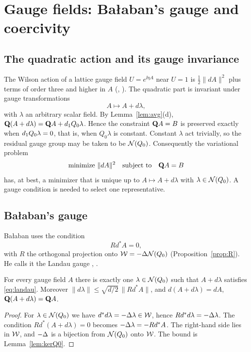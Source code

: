 \section{Gauge fields: \texorpdfstring{Ba\l aban}{Balaban}'s gauge and coercivity}\label{sec:gauge-coercivity}

\subsection{The quadratic action and its gauge invariance}

The Wilson action of a lattice gauge field $U=e^{\ii\eta A}$ near $U=1$ is $\frac12\|dA\|^2$ plus terms of order three and higher in $A$ (\cite[(1.3)]{BalPropI}, \cite[(26)]{BalVar}). The quadratic part is invariant under gauge transformations
\[
A\mapsto A+d\lambda,
\]
with $\lambda$ an arbitrary scalar field. By Lemma~\ref{lem:avg}(d), $\mathbf Q(A+d\lambda)=\mathbf Q A+d_1 Q_0\lambda$. Hence the constraint $\mathbf Q A=B$ is preserved exactly when $d_1 Q_0\lambda=0$, that is, when $Q_0\lambda$ is constant. Constant $\lambda$ act trivially, so the residual gauge group may be taken to be $\mathcal N(Q_0)$. Consequently the variational problem
\[
\text{minimize }\|dA\|^2\quad\text{subject to}\quad\mathbf Q A=B
\]
has, at best, a minimizer that is unique up to $A\mapsto A+d\lambda$ with $\lambda\in\mathcal N(Q_0)$. A gauge condition is needed to select one representative.

\subsection{\texorpdfstring{Ba\l aban}{Balaban}'s gauge}

Ba\l aban uses the condition
\begin{equation}\label{eq:landau}
Rd^*A=0,
\end{equation}
with $R$ the orthogonal projection onto $\mathcal W=-\Delta\mathcal N(Q_0)$ (Proposition~\ref{prop:R}). He calls it the Landau gauge \cite[Sect.~D]{BalPropI}, \cite[(21)]{BalVar}.

\begin{lemma}\label{lem:gauge-fix}
For every gauge field $A$ there is exactly one $\lambda\in\mathcal N(Q_0)$ such that $A+d\lambda$ satisfies \eqref{eq:landau}. Moreover $\|d\lambda\|\le\sqrt{d/2}\,\|Rd^*A\|$, and $d(A+d\lambda)=dA$, $\mathbf Q(A+d\lambda)=\mathbf Q A$.
\end{lemma}

\begin{proof}
For $\lambda\in\mathcal N(Q_0)$ we have $d^*d\lambda=-\Delta\lambda\in\mathcal W$, hence $Rd^*d\lambda=-\Delta\lambda$. The condition $Rd^*(A+d\lambda)=0$ becomes $-\Delta\lambda=-Rd^*A$. The right-hand side lies in $\mathcal W$, and $-\Delta$ is a bijection from $\mathcal N(Q_0)$ onto $\mathcal W$. The bound is Lemma~\ref{lem:kerQ0}.
\end{proof}

